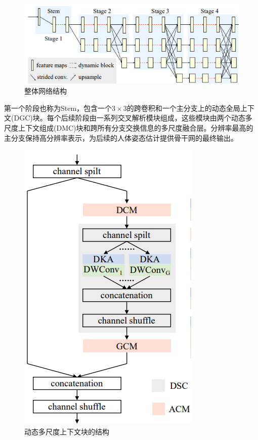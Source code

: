 \documentclass[hyperref]{ctexart}
\begin{document}
\begin{figure}[H]
		\centering
		\includegraphics[scale = 0.7]{1}
		\caption{整体网络结构}
		\label{h}
\end{figure}
	\begin{multicols}{2}
		第一个阶段也称为Stem，包含一个$3\times3$的跨卷积和一个主分支上的动态全局上下文(DGC)块。每个后续阶段由一系列交叉解析模块组成，这些模块由两个动态多尺度上下文组成(DMC)块和跨所有分支交换信息的多尺度融合层。分辨率最高的主分支保持高分辨率表示，为后续的人体姿态估计提供骨干网的最终输出。
		\begin{figure}[H]
			\centering
			\includegraphics[scale = 0.45]{2}
			\caption{动态多尺度上下文块的结构}
			\label{a}
		\end{figure}
	

\end{multicols}
\end{document}
